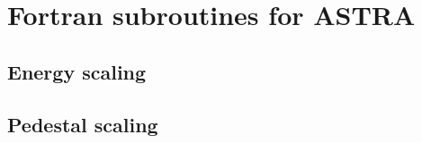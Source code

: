 \chapter{Fortran subroutines for ASTRA}\label{sec:app:sbr}\thispagestyle{fancy}
\section{Energy scaling}\label{sec:app:sbr:wscal}

\section{Pedestal scaling}\label{sec:app:sbr:pedscal}

